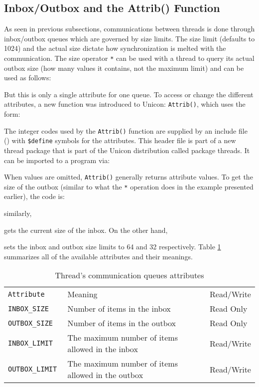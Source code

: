 \subsection{Inbox/Outbox and the Attrib() Function}

As seen in previous subsections, communications between threads is done through
inbox/outbox queues which are governed by size limits. The size limit (defaults to 1024)
and the actual size dictate how synchronization is melted with the communication.
The size operator \texttt{*} can be used with a thread to query its actual outbox size
(how many values it contains, not the maximum limit) and can be used as follows:


\noindent
But this is only a single attribute for one queue. To access or change the
different attributes, a new function was introduced to Unicon:
\texttt{Attrib()}, which uses the form:


\noindent
The integer codes used by the \texttt{Attrib()} function are supplied by an
include file () with \texttt{\$define} symbols for the
attributes. This header file is part of a new thread package that is part
of the Unicon distribution called package threads.  It can be imported to a
program via:


\noindent
When values are omitted, \texttt{Attrib()} generally returns attribute values.
To get the size of the outbox (similar to what the \texttt{*} operation does in the example
presented earlier), the code is:


\noindent similarly,


\noindent gets the current size  of the inbox. On the other hand,


\noindent sets the inbox and outbox size limits to 64 and 32
respectively. Table \ref{Q-attributes} summarizes all of the available attributes and
their meanings.

\begin{table}[h]
\begin{tabular}{>{\texttt\bgroup}l<{\egroup}ll}
{{\textnormal{Attribute}}} & Meaning & Read/Write\\
INBOX\_SIZE   & Number of items in the inbox & Read Only\\
OUTBOX\_SIZE  & Number of items in the outbox& Read Only\\
INBOX\_LIMIT  & The maximum number of items allowed in the inbox & Read/Write\\
OUTBOX\_LIMIT & The maximum number of items allowed in the outbox & Read/Write\\
\end{tabular}
\caption{\label{Q-attributes}Thread's communication queues attributes}
\end{table}

